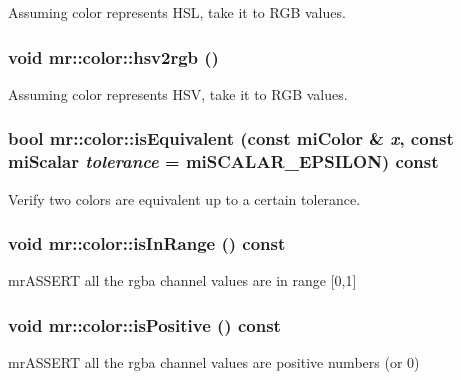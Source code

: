 Assuming color represents HSL, take it to RGB values. 

\subsubsection{\setlength{\rightskip}{0pt plus 5cm}void mr::color::hsv2rgb ()\hspace{0.3cm}{\tt  [inline]}}\label{structmr_1_1color_z0_2}


Assuming color represents HSV, take it to RGB values. 

\subsubsection{\setlength{\rightskip}{0pt plus 5cm}bool mr::color::is\-Equivalent (const mi\-Color \& {\em x}, const mi\-Scalar {\em tolerance} = mi\-SCALAR\_\-EPSILON) const\hspace{0.3cm}{\tt  [inline]}}\label{structmr_1_1color_z15_0}


Verify two colors are equivalent up to a certain tolerance. 

\subsubsection{\setlength{\rightskip}{0pt plus 5cm}void mr::color::is\-In\-Range () const\hspace{0.3cm}{\tt  [inline]}}\label{structmr_1_1color_z8_1}


mr\-ASSERT all the rgba channel values are in range [0,1] 

\subsubsection{\setlength{\rightskip}{0pt plus 5cm}void mr::color::is\-Positive () const\hspace{0.3cm}{\tt  [inline]}}\label{structmr_1_1color_z8_2}


mr\-ASSERT all the rgba channel values are positive numbers (or 0) 

